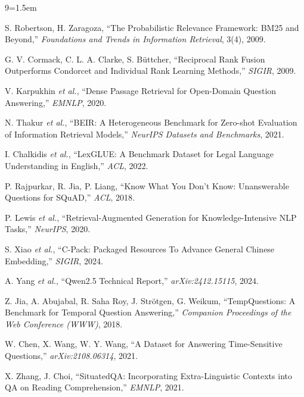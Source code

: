 \documentclass[10pt,a4paper,twocolumn]{article}
\begin{document}
\begin{thebibliography}{9}\scriptsize\linespread{0.96}\sloppy\emergencystretch=1.5em\setlength{\itemsep}{0.6pt}\setlength{\parskip}{0pt}

 S. Robertson, H. Zaragoza, ``The Probabilistic Relevance Framework: BM25 and Beyond,'' \emph{Foundations and Trends in Information Retrieval}, 3(4), 2009.

 G. V. Cormack, C. L. A. Clarke, S. B\"uttcher, ``Reciprocal Rank Fusion Outperforms Condorcet and Individual Rank Learning Methods,'' \emph{SIGIR}, 2009.

 V. Karpukhin \emph{et al.}, ``Dense Passage Retrieval for Open-Domain Question Answering,'' \emph{EMNLP}, 2020.

 N. Thakur \emph{et al.}, ``BEIR: A Heterogeneous Benchmark for Zero-shot Evaluation of Information Retrieval Models,'' \emph{NeurIPS Datasets and Benchmarks}, 2021.

 I. Chalkidis \emph{et al.}, ``LexGLUE: A Benchmark Dataset for Legal Language Understanding in English,'' \emph{ACL}, 2022.

 P. Rajpurkar, R. Jia, P. Liang, ``Know What You Don't Know: Unanswerable Questions for SQuAD,'' \emph{ACL}, 2018.

 P. Lewis \emph{et al.}, ``Retrieval-Augmented Generation for Knowledge-Intensive NLP Tasks,'' \emph{NeurIPS}, 2020.

 S. Xiao \emph{et al.}, ``C-Pack: Packaged Resources To Advance General Chinese Embedding,'' \emph{SIGIR}, 2024.

 A. Yang \emph{et al.}, ``Qwen2.5 Technical Report,'' \emph{arXiv:2412.15115}, 2024.

 Z. Jia, A. Abujabal, R. Saha Roy, J. Str\"otgen, G. Weikum, ``TempQuestions: A Benchmark for Temporal Question Answering,'' \emph{Companion Proceedings of the Web Conference (WWW)}, 2018.

 W. Chen, X. Wang, W. Y. Wang, ``A Dataset for Answering Time-Sensitive Questions,'' \emph{arXiv:2108.06314}, 2021.

 X. Zhang, J. Choi, ``SituatedQA: Incorporating Extra-Linguistic Contexts into QA on Reading Comprehension,'' \emph{EMNLP}, 2021.


\end{thebibliography}
\end{document}
